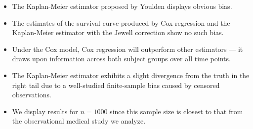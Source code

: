 \documentclass[landscape,a0paper,fontscale=0.285]{baposter} %
\begin{document}
\begin{poster}
{\begin{multicols}{2}
\vspace{3em}

\begin{itemize}
  \setlength\itemsep{0.2em}
  \item The Kaplan-Meier estimator proposed by Youlden displays obvious bias.
  \item The estimates of the survival curve produced by Cox regression and the
    Kaplan-Meier estimator with the Jewell correction show no such bias.
  \item Under the Cox model, Cox regression will outperform other estimators ---
    it draws upon information across both subject groups over all time points.
  \item The Kaplan-Meier estimator exhibits a slight divergence from the truth
    in the right tail due to a well-studied finite-sample bias caused by
    censored observations.
  \item We display results for $n = 1000$ since this sample size is closest to
    that from the observational medical study we analyze.
\end{itemize}

\end{multicols}

}


\end{poster}
\end{document}

